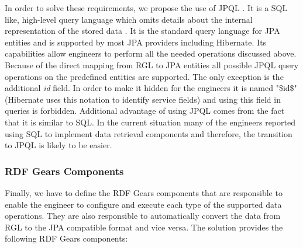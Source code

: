 In order to solve these requirements, we propose the use of JPQL \cite{linwood2010beginning}. It is a SQL like, high-level query language which omits details about the internal representation of the stored data \cite{linwood2010beginning}. It is the standard query language for JPA entities and is supported by most JPA providers including Hibernate. Its capabilities allow engineers to perform all the needed operations discussed above. Because of the direct mapping from RGL to JPA entities all possible JPQL query operations on the predefined entities are supported. The only exception is the additional \textit{id} field. In order to make it hidden for the engineers it is named "\$id\$" (Hibernate uses this notation to identify service fields) and using this field in queries is forbidden. Additional advantage of using JPQL comes from the fact that it is similar to SQL. In the current situation many of the engineers reported using SQL to implement data retrieval components and therefore, the transition to JPQL is likely to be easier.


\subsubsection{RDF Gears Components}
Finally, we have to define the RDF Gears components that are responsible to enable the engineer to configure and execute each type of the supported data operations. They are also responsible to automatically convert the data from RGL to the JPA compatible format and vice versa. The solution provides the following RDF Gears components:

